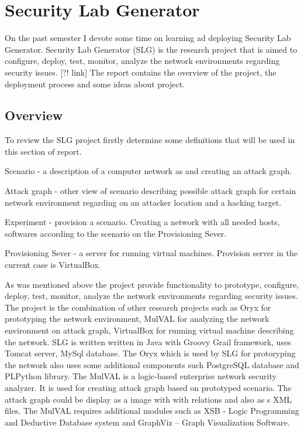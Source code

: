 \documentclass{article}
\begin{document}
\section{Security Lab Generator}
On the past semester I devote some time on learning ad deploying Security Lab Generator.
Security Lab Generator (SLG) is the research project that is aimed to configure, deploy, test, monitor, analyze the network environments regarding security issues. [?! link] The report contains the overview of the project, the deployment process and some ideas about project.
\subsection{Overview}
To review the SLG project firstly determine some definitions that will be used in this section of report.

\begin{compactitem}
\item Scenario - a description of a computer network as and creating an attack graph. 
\item Attack graph - other view of scenario describing possible attack graph for certain network environment regarding on an attacker location and a hacking target.   
\item Experiment - provision a scenario. Creating a network with all needed hosts, softwares according to the scenario on the Provisioning Sever.
\item Provisioning Sever - a server for running virtual machines. Provision server in the current case is VirtualBox.
\end{compactitem}

As was mentioned above the project provide functionality to prototype, configure, deploy, test, monitor, analyze the network environments regarding security issues. The project is the combination of other research projects such as Oryx for prototyping the network environment, MulVAL for analyzing the network environment on attack graph, VirtualBox for running virtual machine describing the network. SLG is written written in Java with Groovy Grail framework, uses Tomcat server, MySql database. The Oryx which is used by SLG for protoryping the network also uses some additional components such PostgreSQL database and PLPython library. The MulVAL is a logic-based enterprise network security analyzer. It is used for creating attack graph based on prototyped scenario. The attack graph could be display as a image with with relations and also as s XML files. The MulVAL requires additional modules such as XSB - Logic Programming and Deductive Database system and GraphViz – Graph Visualization Software.
\end{document}

